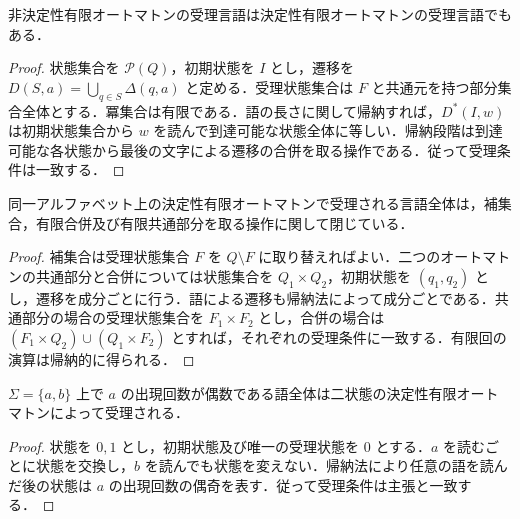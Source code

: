 \begin{prop}[部分集合による決定化]
非決定性有限オートマトンの受理言語は決定性有限オートマトンの受理言語でもある．
\end{prop}
\begin{proof}
状態集合を $\mathcal P(Q)$，初期状態を $I$ とし，遷移を $D(S,a)=\bigcup_{q\in S}\Delta(q,a)$ と定める．受理状態集合は $F$ と共通元を持つ部分集合全体とする．冪集合は有限である．語の長さに関して帰納すれば，$D^*(I,w)$ は初期状態集合から $w$ を読んで到達可能な状態全体に等しい．帰納段階は到達可能な各状態から最後の文字による遷移の合併を取る操作である．従って受理条件は一致する．
\end{proof}
\begin{prop}[受理言語のBoolean演算]
同一アルファベット上の決定性有限オートマトンで受理される言語全体は，補集合，有限合併及び有限共通部分を取る操作に関して閉じている．
\end{prop}
\begin{proof}
補集合は受理状態集合 $F$ を $Q\setminus F$ に取り替えればよい．二つのオートマトンの共通部分と合併については状態集合を $Q_1\times Q_2$，初期状態を $(q_1,q_2)$ とし，遷移を成分ごとに行う．語による遷移も帰納法によって成分ごとである．共通部分の場合の受理状態集合を $F_1\times F_2$ とし，合併の場合は $(F_1\times Q_2)\cup(Q_1\times F_2)$ とすれば，それぞれの受理条件に一致する．有限回の演算は帰納的に得られる．
\end{proof}
\begin{example}[偶数個の文字の認識]
$\Sigma=\{a,b\}$ 上で $a$ の出現回数が偶数である語全体は二状態の決定性有限オートマトンによって受理される．
\end{example}
\begin{proof}
状態を $0,1$ とし，初期状態及び唯一の受理状態を $0$ とする．$a$ を読むごとに状態を交換し，$b$ を読んでも状態を変えない．帰納法により任意の語を読んだ後の状態は $a$ の出現回数の偶奇を表す．従って受理条件は主張と一致する．
\end{proof}
